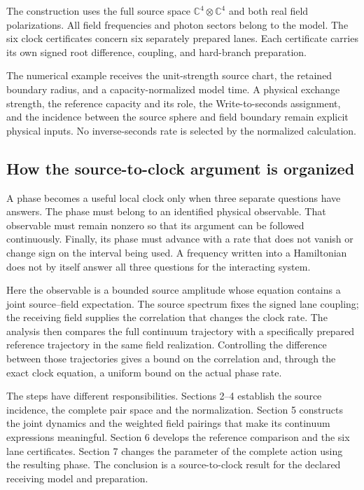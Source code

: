 \documentclass[10pt,twocolumn,letterpaper]{article}
\begin{document}
The construction uses the full source space $\mathbb{C}^{4}\otimes\mathbb{C}^{4}$ and both real field polarizations. All field frequencies and photon sectors belong to the model. The six clock certificates concern six separately prepared lanes. Each certificate carries its own signed root difference, coupling, and hard-branch preparation.

The numerical example receives the unit-strength source chart, the retained boundary radius, and a capacity-normalized model time. A physical exchange strength, the reference capacity and its role, the Write-to-seconds assignment, and the incidence between the source sphere and field boundary remain explicit physical inputs. No inverse-seconds rate is selected by the normalized calculation.

\subsection*{How the source-to-clock argument is organized}
A phase becomes a useful local clock only when three separate questions have answers. The phase must belong to an identified physical observable. That observable must remain nonzero so that its argument can be followed continuously. Finally, its phase must advance with a rate that does not vanish or change sign on the interval being used. A frequency written into a Hamiltonian does not by itself answer all three questions for the interacting system.

Here the observable is a bounded source amplitude whose equation contains a joint source--field expectation. The source spectrum fixes the signed lane coupling; the receiving field supplies the correlation that changes the clock rate. The analysis then compares the full continuum trajectory with a specifically prepared reference trajectory in the same field realization. Controlling the difference between those trajectories gives a bound on the correlation and, through the exact clock equation, a uniform bound on the actual phase rate.

The steps have different responsibilities. Sections 2--4 establish the source incidence, the complete pair space and the normalization. Section 5 constructs the joint dynamics and the weighted field pairings that make its continuum expressions meaningful. Section 6 develops the reference comparison and the six lane certificates. Section 7 changes the parameter of the complete action using the resulting phase. The conclusion is a source-to-clock result for the declared receiving model and preparation.
\end{document}
